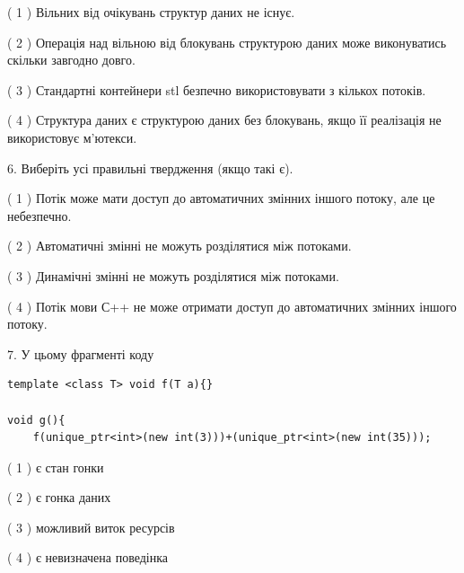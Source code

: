\documentclass[12pt, ukrainian]{article}
\begin{document}
\begin {large}
{( 1 ) Вільних від очікувань структур даних не існує.%

( 2 ) Операція над вільною від блокувань структурою даних може виконуватись скільки завгодно довго.%

( 3 ) Стандартні контейнери stl безпечно використовувати з кількох потоків.%

( 4 ) Структура даних є структурою даних без блокувань, якщо її реалізація не використовує м’ютекси.%
\newpage



\vspace{5mm}
6. Виберіть усі правильні твердження (якщо такі є).\par
\vspace{2mm}

( 1 ) Потік може мати доступ до автоматичних змінних іншого потоку, але це небезпечно.%

( 2 ) Автоматичні змінні не можуть розділятися між потоками.%

( 3 ) Динамічні змінні не можуть розділятися між потоками.%

( 4 ) Потік мови С++ не може отримати доступ до автоматичних змінних іншого потоку.%


\vspace{5mm}
7. У цьому фрагменті коду
\begin{verbatim}
template <class T> void f(T a){}

void g(){
    f(unique_ptr<int>(new int(3)))+(unique_ptr<int>(new int(35)));
\end{verbatim}

( 1 ) є стан гонки%

( 2 ) є гонка даних%

( 3 ) можливий виток ресурсів%

( 4 ) є невизначена поведінка%
}
\end {large}
\end{document}
